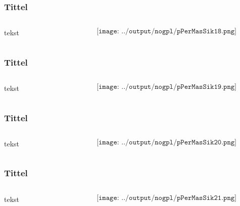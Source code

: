 \documentclass[aspectratio=169,xcolor=dvipsnames]{beamer}
\begin{document}
\begin{frame}
	\frametitle{Tittel}
	\begin{columns}
		\begin{column}{0.5\textwidth}
tekst
			
		\end{column}

		\begin{column}{0.5\textwidth}
	$$\texttt{[image: ../output/nogpl/pPerMasSik18.png]}$$
		\end{column}
	\end{columns}
\end{frame}

\begin{frame}
	\frametitle{Tittel}
	\begin{columns}
		\begin{column}{0.5\textwidth}
tekst
			
		\end{column}

		\begin{column}{0.5\textwidth}
	$$\texttt{[image: ../output/nogpl/pPerMasSik19.png]}$$
		\end{column}
	\end{columns}
\end{frame}

\begin{frame}
	\frametitle{Tittel}
	\begin{columns}
		\begin{column}{0.5\textwidth}
tekst
			
		\end{column}

		\begin{column}{0.5\textwidth}
	$$\texttt{[image: ../output/nogpl/pPerMasSik20.png]}$$
		\end{column}
	\end{columns}
\end{frame}

\begin{frame}
	\frametitle{Tittel}
	\begin{columns}
		\begin{column}{0.5\textwidth}
tekst
			
		\end{column}

		\begin{column}{0.5\textwidth}
	$$\texttt{[image: ../output/nogpl/pPerMasSik21.png]}$$
		\end{column}
	\end{columns}
\end{frame}
\end{document}
